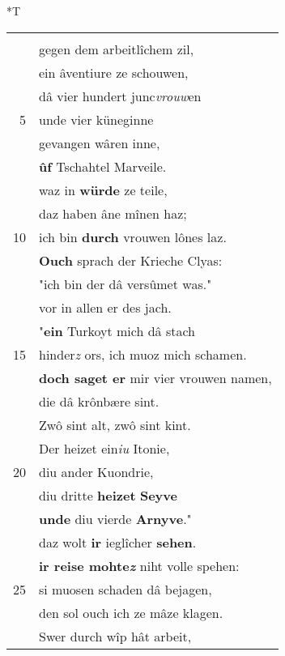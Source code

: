 \documentclass[8pt,a4paper,notitlepage]{article}
\begin{document}
\begin{table}[ht]
\begin{minipage}[t]{0.5\linewidth}
\end{minipage}
\hspace{0.5cm}
\begin{minipage}[t]{0.5\linewidth}
\small
\begin{center}*T
\end{center}
\begin{tabular}{rl}
 & \textbf{\begin{large}O\end{large}uch} \textbf{kêrte} der massenîe vil\\ 
 & gegen dem arbeitlîchem zil,\\ 
 & ein âventiure ze schouwen,\\ 
 & dâ vier hundert junc\textit{vrouw}en\\ 
5 & unde vier küneginne\\ 
 & gevangen wâren inne,\\ 
 & \textbf{ûf} Tschahtel Marveile.\\ 
 & waz in \textbf{würde} ze teile,\\ 
 & daz haben âne mînen haz;\\ 
10 & ich bin \textbf{durch} vrouwen lônes laz.\\ 
 & \textbf{Ouch} sprach der Krieche Clyas:\\ 
 & "ich bin der dâ versûmet was."\\ 
 & vor in allen er des jach.\\ 
 & "\textbf{ein} Turkoyt mich dâ stach\\ 
15 & hinder\textit{z} ors, ich muoz mich schamen.\\ 
 & \textbf{doch saget er} mir vier vrouwen namen,\\ 
 & die dâ krônbære sint.\\ 
 & Zwô sint alt, zwô sint kint.\\ 
 & Der heizet ein\textit{iu} Itonie,\\ 
20 & diu ander Kuondrie,\\ 
 & diu dritte \textbf{heizet} \textbf{Seyve}\\ 
 & \textbf{unde} diu vierde \textbf{Arnyve}."\\ 
 & daz wolt \textbf{ir} ieglîcher \textbf{sehen}.\\ 
 & \textbf{ir reise mohte\textit{z}} niht volle spehen:\\ 
25 & si muosen schaden dâ bejagen,\\ 
 & den sol ouch ich ze mâze klagen.\\ 
 & Swer durch wîp hât arbeit,\\ 

\end{tabular}
\end{minipage}
\end{table}
\end{document}
